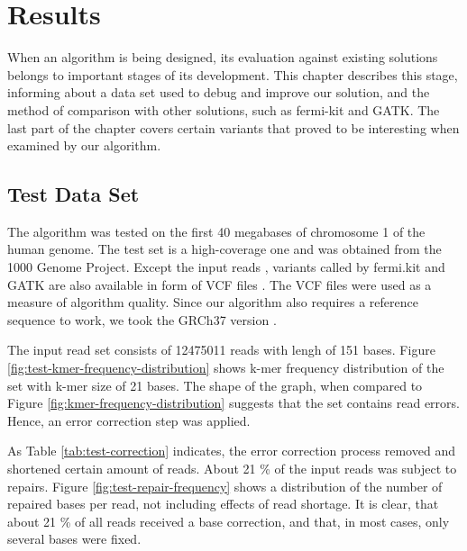 \chapter{Results}
\label{chap:results}

When an algorithm is being designed, its evaluation against existing solutions belongs to important stages of its development. This chapter describes this stage, informing about a data set used to debug and improve our solution, and the method of comparison with other solutions, such as fermi-kit and GATK. The last part of the chapter covers certain variants that proved to be interesting when examined by our algorithm.

\section{Test Data Set}
\label{sec:test-data-set}

The algorithm was tested on the first 40 megabases of chromosome 1 of the human genome. The test set is a high-coverage one and was obtained from the 1000 Genome Project. Except the input reads \cite{testreads}, variants called by fermi.kit and GATK are also available in form of VCF files \cite{testvcf}. The VCF files were used as a measure of algorithm quality. Since our algorithm also requires a reference sequence to work, we took the GRCh37 version \cite{testref}.

The input read set consists of 12475011 reads with lengh of 151 bases. Figure \ref{fig:test-kmer-frequency-distribution} shows k-mer frequency distribution of the set with k-mer size of 21 bases. The shape of the graph, when compared to Figure \ref{fig:kmer-frequency-distribution} suggests that the set contains read errors. Hence, an error correction step was applied.



As Table \ref{tab:test-correction} indicates, the error correction process removed and shortened certain amount of reads. About 21 \% of the input reads was subject to repairs. Figure \ref{fig:test-repair-frequency} shows a distribution of the number of repaired bases per read, not including effects of read shortage. It is clear, that about 21 \% of all reads received a base correction, and that, in most cases, only several bases were fixed. 

